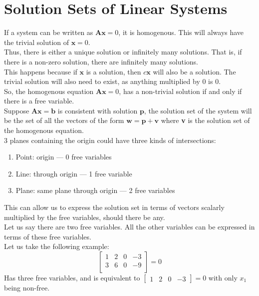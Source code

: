 \documentclass[nobib]{tufte-handout}
\begin{document}
\section{Solution Sets of Linear Systems}
If a system can be written as $\mathbf{Ax}=0$, it is homogenous. This will
always have the trivial solution of $\mathbf{x}=0$.\\ Thus, there is either a
unique solution or infinitely many solutions. That is, if there is a non-zero
solution, there are infinitely many solutions.\\ This happens because if
$\mathbf{x}$ is a solution, then $c\mathbf{x}$ will also be a solution. The
trivial solution will also need to exist, as anything multiplied by 0 is 0.\\
\quad So, the homogenous equation $\mathbf{Ax}=0$, has a non-trivial solution
if and only if there is a free variable.\\ \quad Suppose $\mathbf{Ax=b}$ is
consistent with solution $\mathbf{p}$, the solution set of the system will be
the set of all the vectors of the form $\mathbf{w=p+v}$ where \textbf{v} is the
solution set of the homogenous equation.\\
3 planes containing the origin could have three kinds of intersections:
\begin{enumerate}
    \item Point: origin --- 0 free variables
    \item Line: through origin --- 1 free variable
    \item Plane: same plane through origin --- 2 free variables
\end{enumerate}
This can allow us to express the solution set in terms of vectors scalarly multiplied by the free variables, should there be any.\\
Let us say there are two free variables. All the other variables can be expressed in terms of these free variables.\\
Let us take the following example:
\begin{equation*}
    \begin{bmatrix}
        1 & 2 & 0 & -3 \\
        3 & 6 & 0 & -9 \\
    \end{bmatrix} = 0
\end{equation*}
Has three free variables, and is equivalent to $\begin{bmatrix}1 & 2 & 0 & -3\end{bmatrix} = 0$ with only $x_1$ being non-free.\\
\end{document}

